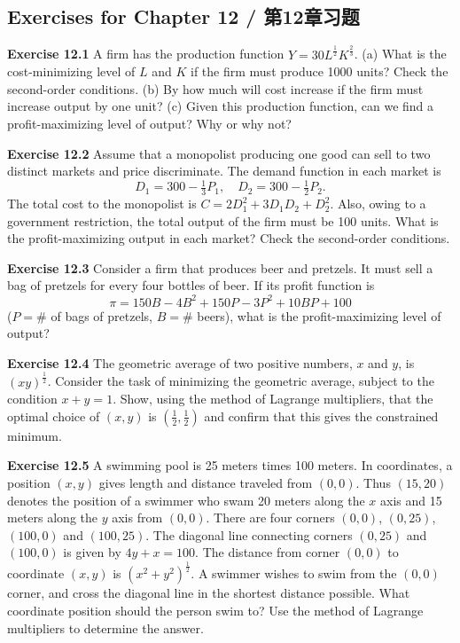 \subsection*{Exercises for Chapter 12 / 第12章习题}

\begin{original}
\textbf{Exercise 12.1} A firm has the production function $Y = 30L^{\frac{1}{2}}K^{\frac{2}{3}}$.
(a) What is the cost-minimizing level of $L$ and $K$ if the firm must produce 1000 units? Check the second-order conditions.
(b) By how much will cost increase if the firm must increase output by one unit?
(c) Given this production function, can we find a profit-maximizing level of output? Why or why not?

\textbf{Exercise 12.2} Assume that a monopolist producing one good can sell to two distinct markets and price discriminate. The demand function in each market is
\[
D_1 = 300 - \tfrac{1}{3}P_1, \quad D_2 = 300 - \tfrac{1}{2}P_2.
\]
The total cost to the monopolist is $C = 2D_1^2 + 3D_1D_2 + D_2^2$. Also, owing to a government restriction, the total output of the firm must be 100 units. What is the profit-maximizing output in each market? Check the second-order conditions.

\textbf{Exercise 12.3} Consider a firm that produces beer and pretzels. It must sell a bag of pretzels for every four bottles of beer. If its profit function is
\[
\pi = 150B - 4B^2 + 150P - 3P^2 + 10BP + 100
\]
($P = \#$ of bags of pretzels, $B = \#$ beers), what is the profit-maximizing level of output?

\textbf{Exercise 12.4} The geometric average of two positive numbers, $x$ and $y$, is $(xy)^{\frac{1}{2}}$. Consider the task of minimizing the geometric average, subject to the condition $x + y = 1$. Show, using the method of Lagrange multipliers, that the optimal choice of $(x, y)$ is $(\frac{1}{2}, \frac{1}{2})$ and confirm that this gives the constrained minimum.

\textbf{Exercise 12.5} A swimming pool is 25 meters times 100 meters. In coordinates, a position $(x, y)$ gives length and distance traveled from $(0,0)$. Thus $(15,20)$ denotes the position of a swimmer who swam 20 meters along the $x$ axis and 15 meters along the $y$ axis from $(0,0)$. There are four corners $(0,0)$, $(0,25)$, $(100,0)$ and $(100,25)$. The diagonal line connecting corners $(0,25)$ and $(100,0)$ is given by $4y + x = 100$. The distance from corner $(0,0)$ to coordinate $(x, y)$ is $(x^2 + y^2)^{\frac{1}{2}}$. A swimmer wishes to swim from the $(0,0)$ corner, and cross the diagonal line in the shortest distance possible. What coordinate position should the person swim to? Use the method of Lagrange multipliers to determine the answer.


\end{original}
